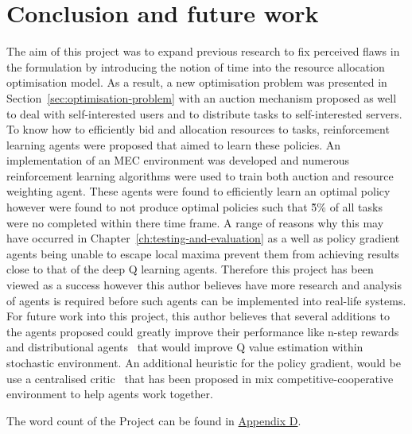 \chapter{Conclusion and future work}\label{ch:conclusion-and-future-work}
The aim of this project was to expand previous research to fix perceived flaws in the formulation by introducing the
notion of time into the resource allocation optimisation model. As a result, a new optimisation problem was presented
in Section~\ref{sec:optimisation-problem} with an auction mechanism proposed as well to deal with self-interested
users and to distribute tasks to self-interested servers. To know how to efficiently bid and allocation resources to
tasks, reinforcement learning agents were proposed that aimed to learn these policies. An implementation of an MEC
environment was developed and numerous reinforcement learning algorithms were used to train both auction and resource
weighting agent. These agents were found to efficiently learn an optimal policy however were found to not produce
optimal policies such that \~5\% of all tasks were no completed within there time frame. A range of reasons why this
may have occurred in Chapter~\ref{ch:testing-and-evaluation} as a well as policy gradient agents being unable to
escape local maxima prevent them from achieving results close to that of the deep Q learning agents. Therefore this
project has been viewed as a success however this author believes have more research and analysis of agents is required
before such agents can be implemented into real-life systems. \\
For future work into this project, this author believes that several additions to the agents proposed could greatly
improve their performance like n-step rewards~\citep{multi-step-dqn} and distributional agents~\citep{distributional_dqn}
that would improve Q value estimation within stochastic environment. An additional heuristic for the policy gradient,
would be use a centralised critic~\citep{maddpg} that has been proposed in mix competitive-cooperative environment to
help agents work together.

The word count of the Project can be found in \hyperref[app:project-management]{Appendix D}.
